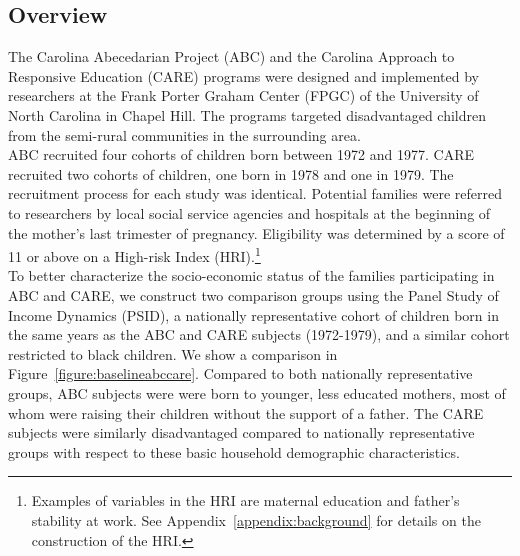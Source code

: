 \subsection{Overview}

\noindent The Carolina Abecedarian Project (ABC) and the Carolina Approach to Responsive Education (CARE) programs were designed and implemented by researchers at the Frank Porter Graham Center (FPGC) of the University of North Carolina in Chapel Hill. The programs targeted disadvantaged children from the semi-rural communities in the surrounding area.\\

\noindent ABC recruited four cohorts of children born between 1972 and 1977. CARE recruited two cohorts of children, one born in 1978 and one in 1979. The recruitment process for each study was identical. Potential families were referred to researchers by local social service agencies and hospitals at the beginning of the mother's last trimester of pregnancy. Eligibility was determined by a score of 11 or above on a High-risk Index (HRI).\footnote{Examples of variables in the HRI are maternal education and father's stability at work. See Appendix~\ref{appendix:background} for details on the construction of the HRI.} \\

\noindent To better characterize the socio-economic status of the families participating in ABC and CARE, we construct two comparison groups using the Panel Study of Income Dynamics (PSID), a nationally representative cohort of children born in the same years as the ABC and CARE subjects (1972-1979), and a similar cohort restricted to black children. We show a comparison in Figure~\ref{figure:baselineabccare}. Compared to both nationally representative groups, ABC subjects were were born to younger, less educated mothers, most of whom were raising their children without the support of a father. The CARE subjects were similarly disadvantaged compared to nationally representative groups with respect to these basic household demographic characteristics.

\begin{center}

\end{center}

